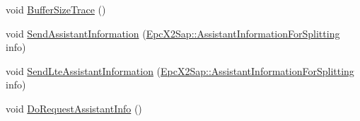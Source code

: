 \begin{DoxyCompactItemize}
\item 
void \hyperlink{classns3_1_1LteRlcAm_add3deab7ad7c96b571cea35aa28308c5}{Buffer\+Size\+Trace} ()
\item 
void \hyperlink{classns3_1_1LteRlcAm_a2be4deb8b579e4cc90ed97a0f79f7db7}{Send\+Assistant\+Information} (\hyperlink{structns3_1_1EpcX2Sap_1_1AssistantInformationForSplitting}{Epc\+X2\+Sap\+::\+Assistant\+Information\+For\+Splitting} info)
\item 
void \hyperlink{classns3_1_1LteRlcAm_a5aae277d58b87abb89b62464ea6e7d9e}{Send\+Lte\+Assistant\+Information} (\hyperlink{structns3_1_1EpcX2Sap_1_1AssistantInformationForSplitting}{Epc\+X2\+Sap\+::\+Assistant\+Information\+For\+Splitting} info)
\item 
void \hyperlink{classns3_1_1LteRlcAm_a9c68a7efc9ad9912b18e7c4b8340fae4}{Do\+Request\+Assistant\+Info} ()
\end{DoxyCompactItemize}
